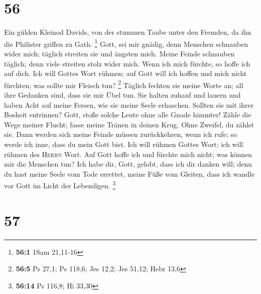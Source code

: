 \hypertarget{section-22}{%
\section{56}\label{section-22}}

 Ein gülden Kleinod Davids, von der stummen Taube unter
den Fremden, da ihn die Philister griffen zu Gath. \footnote{\textbf{56:1}
  1Sam 21,11-16}  Gott, sei mir gnädig, denn Menschen
schnauben wider mich; täglich streiten sie und ängsten mich.
 Meine Feinde schnauben täglich; denn viele streiten stolz
wider mich.  Wenn ich mich fürchte, so hoffe ich auf dich.
 Ich will Gottes Wort rühmen; auf Gott will ich hoffen und
mich nicht fürchten; was sollte mir Fleisch tun? \footnote{\textbf{56:5}
  Ps 27,1; Ps 118,6; Jes 12,2; Jes 51,12; Hebr 13,6} 
Täglich fechten sie meine Worte an; all ihre Gedanken sind, dass sie mir
Übel tun.  Sie halten zuhauf und lauern und haben Acht auf
meine Fersen, wie sie meine Seele erhaschen.  Sollten sie
mit ihrer Bosheit entrinnen? Gott, stoße solche Leute ohne alle Gnade
hinunter!  Zähle die Wege meiner Flucht; fasse meine
Tränen in deinen Krug. Ohne Zweifel, du zählst sie.  Dann
werden sich meine Feinde müssen zurückkehren, wenn ich rufe; so werde
ich inne, dass du mein Gott bist.  Ich will rühmen Gottes
Wort; ich will rühmen des \textsc{Herrn} Wort.  Auf Gott
hoffe ich und fürchte mich nicht; was können mir die Menschen tun?
 Ich habe dir, Gott, gelobt, dass ich dir danken will;
 denn du hast meine Seele vom Tode errettet, meine Füße
vom Gleiten, dass ich wandle vor Gott im Licht der Lebendigen.
\footnote{\textbf{56:14} Ps 116,8; Hi 33,30}

\hypertarget{section-23}{%
\section{57}\label{section-23}}

